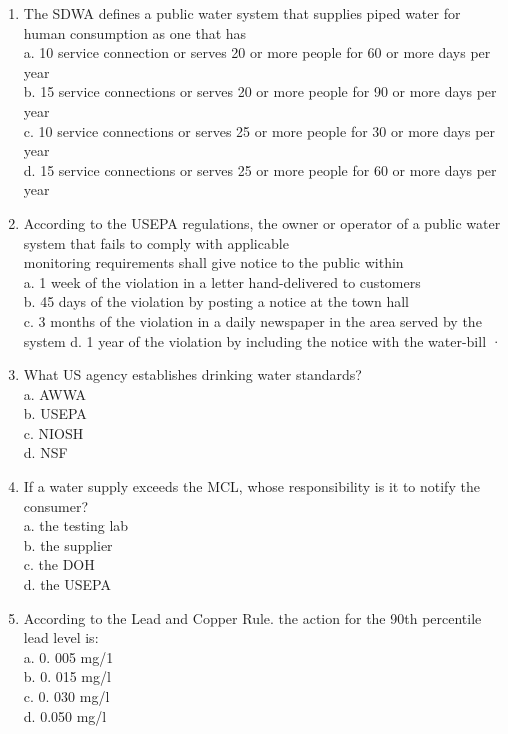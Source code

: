 \documentclass[10pt]{article}
\begin{document}
\begin{enumerate}
\item The SDWA defines a public water system that supplies piped water for human consumption as one that has\\
a.	10 service connection or serves 20 or more people for 60 or more days per year\\
b.	15 service connections or serves 20 or more people for 90 or more days per year\\
c.	10 service connections or serves 25 or more people for 30 or more days per year\\
d.	15 service connections or serves 25 or more people for 60 or more days per year\\

\item According to the USEPA regulations, the owner or operator of a public water system that fails to comply with applicable\\
monitoring requirements shall give notice to the public within\\
a.	1 week of the violation in a letter hand-delivered to customers\\
b.	45 days of the violation by posting a notice at the town hall\\
c. 	3 months of the violation in a daily newspaper in the area served by the system 
d.  1 year of the violation by including the notice with the water-bill ·\\

\item What US agency establishes drinking water standards?\\
a.	AWWA\\
b.	USEPA\\
c.	NIOSH\\
d.	NSF\\

\item If a water supply exceeds the MCL, whose responsibility is it to notify the consumer?\\
a.	the testing lab\\
b. 	the supplier\\
c.	the DOH\\
d.	the USEPA\\

\item According to the Lead and Copper Rule. the action for the 90th percentile lead level is:\\
a.	0. 005 mg/1\\
b.	0. 015 mg/l\\
c.	0. 030 mg/l\\
d.	0.050 mg/l\\



\end{enumerate}
\end{document}
